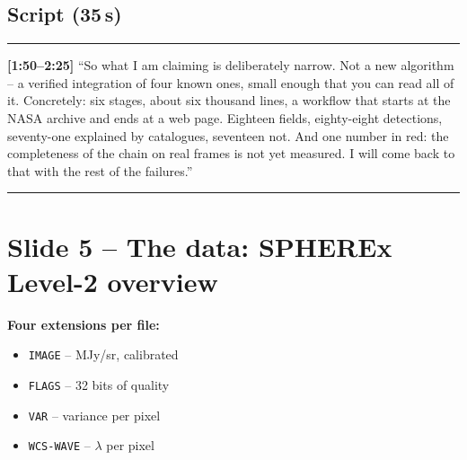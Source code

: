 \documentclass[11pt,a4paper]{article}
\begin{document}
\begin{center}
\end{center}

\subsection*{Script (35\,s)}
\noindent\rule{\linewidth}{0.3pt}\par\smallskip\noindent
\textbf{[1:50--2:25]} ``So what I am claiming is deliberately narrow. Not a new algorithm -- a verified
integration of four known ones, small enough that you can read all of it. Concretely: six stages, about
six thousand lines, a workflow that starts at the NASA archive and ends at a web page. Eighteen
fields, eighty-eight detections, seventy-one explained by catalogues, seventeen not. And one number in
red: the completeness of the chain on real frames is not yet measured. I will come back to that with
the rest of the failures.''
\par\smallskip\noindent\rule{\linewidth}{0.3pt}

\section{Slide 5 -- The data: SPHEREx Level-2 overview}

\textbf{Four extensions per file:}
\begin{itemize}[leftmargin=1em,itemsep=2pt]
\item \texttt{IMAGE} -- MJy/sr, calibrated
\item \texttt{FLAGS} -- 32 bits of quality
\item \texttt{VAR} -- variance per pixel
\item \texttt{WCS-WAVE} -- $\lambda$ per pixel
\end{itemize}
\end{document}
